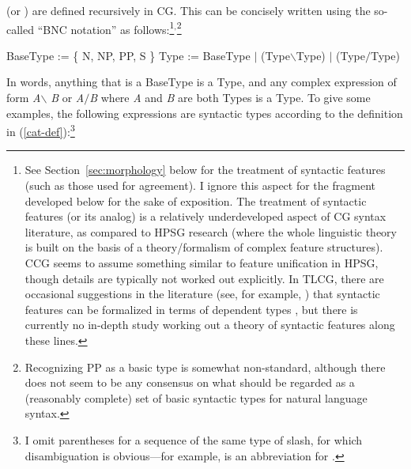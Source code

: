\documentclass[output=paper
                ,modfonts
                ,nonflat
	        ,collection
	        ,collectionchapter
	        ,collectiontoclongg
 	        ,biblatex
                ,babelshorthands
                ,newtxmath
                ,draftmode
                ,colorlinks, citecolor=brown
]{./langsci/langscibook}
\begin{document}
 (or ) are defined recursively
in CG. This can be concisely written using the so-called
``BNC notation'' as follows:\footnote{See Section~\ref{sec:morphology} below
for the treatment of syntactic features (such as those used for
agreement). I ignore this aspect for the fragment developed below for the sake of
exposition. The treatment of syntactic features (or its analog)
is a relatively underdeveloped aspect of CG syntax literature,
as compared to HPSG research (where the whole linguistic theory is
built on the basis of a theory/formalism of complex feature
structures). CCG seems to assume something similar to 
feature unification in HPSG, though details are typically not
worked out explicitly. In TLCG, there are occasional suggestions in the
literature (see, for example, \citealt{Morrill94a-u,pogodallapompigne2011})
that syntactic features can be formalized in terms of
dependent types \citep{MartinLofIntuitionistic,ranta94}, but
there is currently no in-depth study working out a theory of
syntactic features along these lines.}$^,$\footnote{Recognizing PP as
a basic type is somewhat  
non-standard, although there does not seem to be any consensus on
what should be regarded as a (reasonably complete) set of
basic syntactic types for natural language syntax.}

\begin{exe}
 \ex\label{cat-def}
  \begin{xlist}
 \ex\label{bascat}
    BaseType := \{ N,  NP, PP, S \}
 \ex\label{complex-cat}
    Type := BaseType $|$ (Type\ensuremath{\backslash}Type) $|$ (Type\ensuremath{/}Type)
  \end{xlist}
\end{exe}
In words, anything that is a BaseType is a Type, and
any complex expression of form
\textit{A}\ensuremath{\backslash} \textit{B}  or
\textit{A}\ensuremath{/}\textit{B} where \textit{A} and \textit{B} are both
Types is a Type. To give some examples, the following expressions are
syntactic types according to the definition in
(\ref{cat-def}):\footnote{I omit
parentheses for a sequence of the same type of slash, for which
disambiguation is obvious---for example,  is an abbreviation for .}

\begin{exe}
 \ex
  \begin{xlist}
 \ex
 \ex
 \ex
 \ex
  \end{xlist}
\end{exe}
\end{document}
